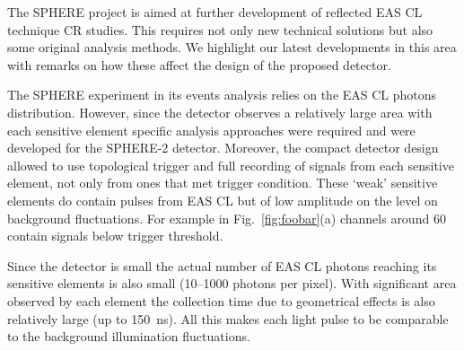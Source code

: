 \documentclass[a4paper,11pt]{article}
\begin{document}
The SPHERE project is aimed at further development of reflected EAS CL technique CR studies. This requires not only new technical solutions but also some original analysis methods. We highlight our latest developments in this area with remarks on how these affect the design of the proposed detector.


The SPHERE experiment in its events analysis relies on the EAS CL photons distribution. However, since the detector observes a relatively large area with each sensitive element specific analysis approaches were required and were developed for the SPHERE-2 detector. Moreover, the compact detector design allowed to use topological trigger and full recording of signals from each sensitive element, not only from ones that met trigger condition. These `weak' sensitive elements do contain pulses from EAS CL but of low amplitude on the level on background fluctuations. For example in Fig.~\ref{fig:foobar}(a) channels around 60 contain signals below trigger threshold. 

Since the detector is small the actual number of EAS CL photons reaching its sensitive elements is also small (10--1000 photons per pixel). With significant area observed by each element the collection time due to geometrical effects is also relatively large (up to 150~ns). All this makes each light pulse to be comparable to the background illumination fluctuations. 


\end{document}
